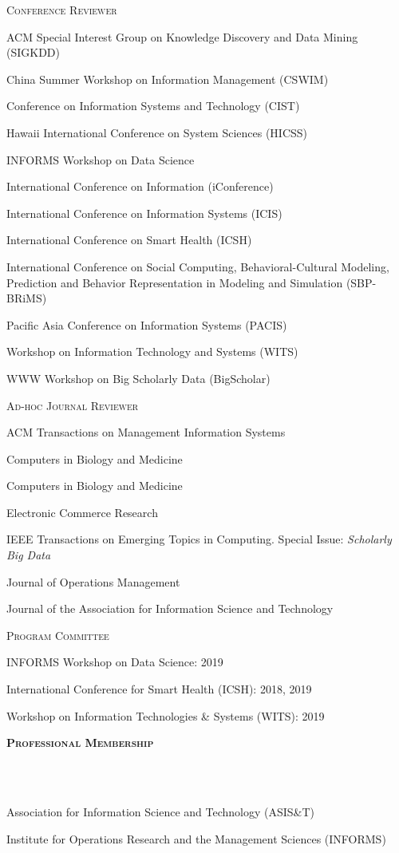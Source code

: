 \documentclass{article}
\newcommand{\header}[1]{{
\hspace*{-15pt}\vspace*{6pt} \textbf{\textsc{\large{#1}}}} \vspace*{-6pt} 
\lineunder
}
\newcommand{\lineunder}{
\vspace*{-8pt} \\ \hspace*{-15pt} 
\hrulefill \\
}
\renewcommand{\labelitemii}{
$\vcenter{\hbox{\tiny$\bullet$}}$\hspace*{-3pt}
}
\newenvironment{bullet-list-major}{
\begin{list}{\labelitemii}{\setlength\leftmargin{3pt} 
\topsep 0pt \itemsep -2pt}}{\vspace*{4pt}\end{list}
}
\begin{document}
\begin{bullet-list-major}
  \item [\hspace{10pt}\textsc{\normalsize{Conference Reviewer}}]
  \item ACM Special Interest Group on Knowledge Discovery and Data Mining (SIGKDD)
    \item China Summer Workshop on Information Management (CSWIM)
  \item Conference on Information Systems and Technology (CIST)
  \item Hawaii International Conference on System Sciences (HICSS)
  \item INFORMS Workshop on Data Science
  \item International Conference on Information (iConference)
  \item International Conference on Information Systems (ICIS)
  \item International Conference on Smart Health (ICSH)
  \item International Conference on Social Computing, Behavioral-Cultural Modeling, Prediction and Behavior Representation in Modeling and Simulation (SBP-BRiMS)
  \item Pacific Asia Conference on Information Systems (PACIS)
  \item Workshop on Information Technology and Systems (WITS)
  \item WWW Workshop on Big Scholarly Data (BigScholar)
\end{bullet-list-major}
\begin{bullet-list-major}
    \item [\hspace{10pt}\textsc{\normalsize{Ad-hoc Journal Reviewer}}]
    \item ACM Transactions on Management Information Systems 
    \item Computers in Biology and Medicine
    \item Computers in Biology and Medicine
    \item Electronic Commerce Research
    \item IEEE Transactions on Emerging Topics in Computing. Special Issue: \textit{Scholarly Big Data}
    \item Journal of Operations Management
    \item Journal of the Association for Information Science and Technology
\end{bullet-list-major}
\begin{bullet-list-major}
    \item [\hspace{10pt}\textsc{\normalsize{Program Committee}}]
    \item INFORMS Workshop on Data Science: 2019
    \item International Conference for Smart Health (ICSH): 2018, 2019
    \item Workshop on Information Technologies \& Systems (WITS): 2019
\end{bullet-list-major}

\vspace*{4pt}
\header{Professional Membership}
\begin{bullet-list-major}
\item Association for Information Science and Technology (ASIS\&T)
\item Institute for Operations Research and the Management Sciences (INFORMS)
\end{bullet-list-major}
\end{document}
